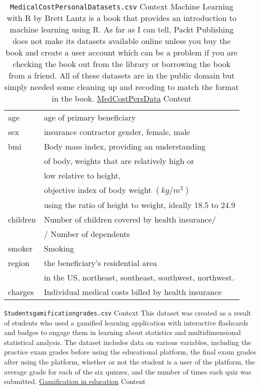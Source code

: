 \documentclass[12pt]{article}
\theoremstyle{remark}
\begin{document}
\begin{table}
	\caption{ \texttt{MedicalCostPersonalDatasets.csv}
Context
Machine Learning with R by Brett Lantz is a book that provides an introduction to machine learning using R. As far as I can tell, Packt Publishing does not make its datasets available online unless you buy the book and create a user account which can be a problem if you are checking the book out from the library or borrowing the book from a friend. All of these datasets are in the public domain but simply needed some cleaning up and recoding to match the format in the book.
\href{https://www.kaggle.com/datasets/mirichoi0218/insurance}{MedCostPersData} Content
}
	\begin{tabular}{l|l}\hline
age & age of primary beneficiary\\

sex & insurance contractor gender, female, male\\
bmi & Body mass index, providing an understanding \\
&  of body, weights that are relatively high or \\
& low relative to height,\\
& objective index of body weight $(kg / m ^ 2)$ \\
& using the ratio of height to weight, ideally 18.5 to 24.9\\

children & Number of children covered by health insurance/ \\
& / Number of dependents\\

smoker & Smoking\\

region & the beneficiary's residential area \\
& in the US, northeast, southeast, southwest, northwest.\\

charges & Individual medical costs billed by health insurance\\

	\hline
	\end{tabular}
\end{table}


\begin{table}
	\caption{ \texttt{Studentsgamificationgrades.csv}
Context
This dataset was created as a result of students who used a gamified learning application with interactive flashcards and badges to engage them in learning about statistics and multidimensional statistical analysis.
The dataset includes data on various variables, including the practice exam grades before using the educational platform, the final exam grades after using the platform, whether or not the student is a user of the platform, the average grade for each of the six quizzes, and the number of times each quiz was submitted.
\href{https://www.kaggle.com/datasets/gianinamariapetrascu/gamification-students-grades}{Gamification in education} Content
}

\end{table}
\end{document}
